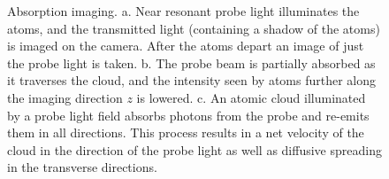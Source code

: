 \documentclass[12pt]{iopart}
\begin{document}
\begin{figure}
\caption{Absorption imaging. a. Near resonant probe light illuminates the atoms, and the transmitted light (containing a shadow of the atoms) is imaged on the camera. After the atoms depart an image of just the probe light is taken. b.  The probe beam is partially absorbed as it traverses the cloud, and the intensity seen by atoms further along the imaging direction $z$ is lowered.  c. An atomic cloud illuminated by a probe light field absorbs photons from the probe and re-emits them in all directions. This process results in a net velocity of the cloud in the direction of the probe light as well as diffusive spreading in the transverse directions.  }  
\label{fig:absorptionIntor}
\end{figure}
\end{document}
